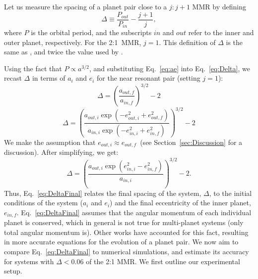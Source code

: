 Let us measure the spacing of a planet pair close to a $j:j+1$ MMR by defining 
\begin{equation}
\Delta \equiv \frac{P_{out}}{P_{in}} - \frac{j+1}{j},
\label{eq:Delta}
\end{equation}
where $P$ is the orbital period, and the subscripts $in$ and $out$ refer to the inner and outer planet, respectively. 
For the 2:1~MMR, $j= 1$. 
This definition of $\Delta$ is the same as \citet{Lee2013}, and twice the value used by \citet{LithwickWu2012}. 

Using the fact that $P \propto a^{3/2}$, and substituting Eq.~\ref{eq:ae} into Eq.~\ref{eq:Delta}, we recast $\Delta$ in terms of $a_i$ and $e_i$ for the near resonant pair (setting $j=1$):
\begin{equation}
\Delta = \left(\frac{a_{out,f}}{a_{in,f}} \right)^{3/2} - 2
\label{eq:DeltaInitial}
\end{equation}
\begin{equation*}
\Delta = \left(\frac{a_{out,i}\exp(-e_{out,i}^2 + e_{out,f}^2)}{a_{in,i}\exp(-e_{in,i}^2 + e_{in,f}^2)} \right)^{3/2} - 2
\end{equation*}
We make the assumption that $e_{out,i} \approx e_{out,f}$~(see Section~\ref{sec:Discussion} for a discussion).
After simplifying, we get:
\begin{equation}
\Delta = \left(\frac{a_{out,i}\exp(e_{in,i}^2 - e_{in,f}^2)}{a_{in,i}} \right)^{3/2} - 2.
\label{eq:DeltaFinal}
\end{equation}
Thus, Eq.~\ref{eq:DeltaFinal} relates the final spacing of the system, $\Delta$, to the initial conditions of the system ($a_i$ and $e_i$) and the final eccentricity of the inner planet, $e_{in,f}$.
Eq.~\ref{eq:DeltaFinal} assumes that the angular momentum of each individual planet is conserved, which in general is not true for multi-planet systems (only total angular momentum is).
Other works \citep{LithwickWu2012,Batygin2013} have accounted for this fact, resulting in more accurate equations for the evolution of a planet pair.
We now aim to compare Eq.~\ref{eq:DeltaFinal} to numerical simulations, and estimate its accuracy for \kep{} systems with $\Delta < 0.06$ of the 2:1 MMR. 
We first outline our experimental setup.

